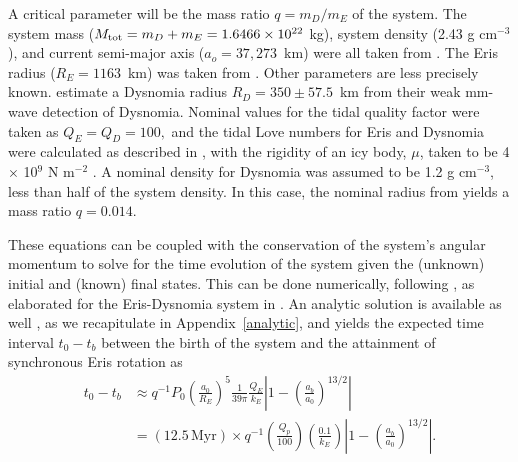\documentclass[onecolumn]{aastex631}
\begin{document}
A critical parameter will be the mass ratio $q=m_D/m_E$ of the system.
The system mass ($M_{\rm tot}=m_D+m_E=1.6466 \times 10^{22}$ kg), system density (2.43 g cm$^{-3}$), and current semi-major axis ($a_o=37,273$~km) were all taken from \citet{H21}. The Eris radius ($R_E=1163$~km) was taken from \citet{Sicardy}.
Other parameters are less precisely known.  \citet{BB2018} estimate a
Dysnomia radius $R_D=350\pm57.5$~km from their weak mm-wave detection of Dysnomia.
Nominal values for the tidal quality factor were taken as $Q_E=Q_D=100,$ and the tidal Love numbers for Eris and Dysnomia were calculated as described in \citet{MD2000}, with the rigidity of an icy body, $\mu$, taken to be 4 $\times$ 10$^9$ N m$^{-2}$ \citep{Hastings16}.  A nominal density for Dysnomia was assumed to be 1.2 g cm$^{-3}$, less than half of the system density. In this case, the nominal radius from \citet{BB2018} yields a mass ratio $q=0.014.$

These equations can be coupled with the conservation of the system's angular momentum to solve for the time evolution of the system given the (unknown) initial and (known) final states. This can be done numerically, following \citet{Hastings16}, as elaborated for the Eris-Dysnomia system in \citet{szakats}.  An analytic solution is available as well \citep[e.g.,][]{MD2000}, as we recapitulate in Appendix~\ref{analytic}, and yields the expected time interval $t_0-t_b$ between the birth of the system and the attainment of synchronous Eris rotation as
  \begin{align}
    t_0-t_b & \approx q^{-1} P_0 \left(\frac{a_0}{R_E}\right)^{5} \frac{1}{39\pi}\frac{Q_E}{k_E} \left| 1 - \left(\frac{a_b}{a_0}\right)^{13/2}\right|\\
            & = (12.5\,\textrm{Myr}) \times q^{-1} \left(\frac{Q_p}{100}\right) \left(\frac{0.1}{k_E}\right) \left| 1 - \left(\frac{a_b}{a_0}\right)^{13/2}\right|.
              \label{dtanalytic}
  \end{align}
\end{document}

